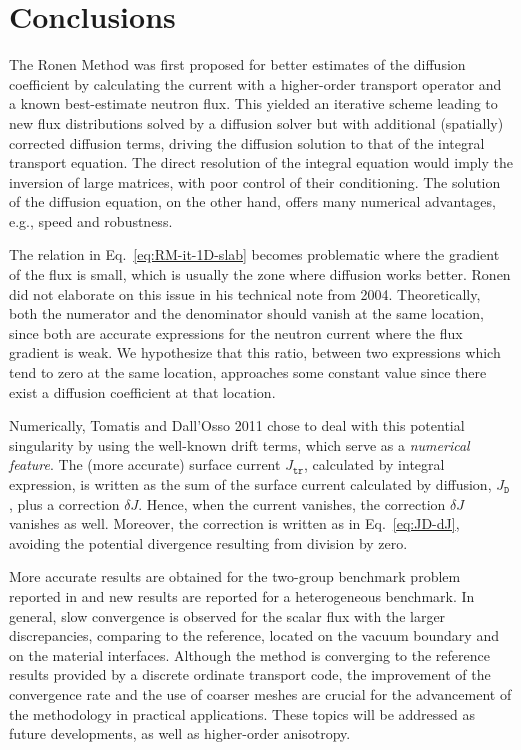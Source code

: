 %
\section{Conclusions}
\label{sec:conc}

The Ronen Method was first proposed for better estimates of the diffusion coefficient by calculating the current with a higher-order transport operator and a known best-estimate neutron flux. This yielded an iterative scheme leading to new flux distributions solved by a diffusion solver but with additional (spatially) corrected diffusion terms, driving the diffusion solution to that of the integral transport equation. The direct resolution of the integral equation would imply the inversion of large matrices, with poor control of their conditioning. The solution of the diffusion equation, on the other hand, offers many numerical advantages, e.g., speed and robustness. 

The relation in Eq.~\eqref{eq:RM-it-1D-slab} becomes problematic where the gradient of the flux is small, which is usually the zone where diffusion works better. Ronen did not elaborate on this issue in his technical note from 2004. Theoretically, both the numerator and the denominator should vanish at the same location, since both are accurate expressions for the neutron current where the flux gradient is weak. We hypothesize that this ratio, between two expressions which tend to zero at the same location, approaches some constant value since there exist a diffusion coefficient at that location. 

Numerically, Tomatis and Dall'Osso 2011 chose to deal with this potential singularity by using the well-known drift terms, which serve as a \emph{numerical feature}. The (more accurate) surface current $J_{\texttt{tr}}$, calculated by integral expression, is written as the sum of the surface current calculated by diffusion, $J_\texttt{D}$, plus a correction $\delta J$. Hence, when the current vanishes, the correction $\delta J$ vanishes as well. Moreover, the correction is written as in Eq.~\eqref{eq:JD-dJ}, avoiding the potential divergence resulting from division by zero.


More accurate results are obtained for the two-group benchmark problem reported in \cite{Tomatis-2011} and new results are reported for a heterogeneous benchmark. In general, slow convergence is observed for the scalar flux with the larger discrepancies, comparing to the reference, located on the vacuum boundary and on the material interfaces. Although the method is converging to the reference results provided by a discrete ordinate transport code, the improvement of the convergence rate and the use of coarser meshes are crucial for the advancement of the methodology in practical applications. These topics will be addressed as future developments, as well as higher-order anisotropy.


